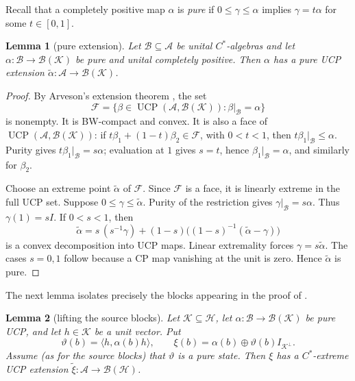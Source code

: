 \documentclass[11pt]{article}
\newtheorem{lemma}{Lemma}
\newcommand{\A}{\mathcal A}
\newcommand{\B}{\mathcal B}
\newcommand{\Hh}{\mathcal H}
\newcommand{\K}{\mathcal K}
\newcommand{\BH}{\mathcal B(\Hh)}
\newcommand{\UCP}{\operatorname{UCP}}
\begin{document}
Recall that a completely positive map $\alpha$ is \emph{pure} if
$0\leq\gamma\leq\alpha$ implies $\gamma=t\alpha$ for some $t\in[0,1]$.

\begin{lemma}[pure extension]\label{lem:pure-extension}
Let $\B\subseteq\A$ be unital $C^*$-algebras and let
$\alpha:\B\to\mathcal B(\K)$ be pure and unital completely positive. Then
$\alpha$ has a pure UCP extension
$\widetilde\alpha:\A\to\mathcal B(\K)$.
\end{lemma}

\begin{proof}
By Arveson's extension theorem \cite{Arveson}, the set
\[
 \mathcal F=\{\beta\in\UCP(\A,\mathcal B(\K)):\beta|_{\B}=\alpha\}
\]
is nonempty. It is BW-compact and convex. It is also a face of
$\UCP(\A,\mathcal B(\K))$: if
$t\beta_1+(1-t)\beta_2\in\mathcal F$, with $0<t<1$, then
$t\beta_1|_{\B}\leq\alpha$. Purity gives
$t\beta_1|_{\B}=s\alpha$; evaluation at $1$ gives $s=t$, hence
$\beta_1|_{\B}=\alpha$, and similarly for $\beta_2$.

Choose an extreme point $\widetilde\alpha$ of $\mathcal F$. Since $\mathcal F$
is a face, it is linearly extreme in the full UCP set. Suppose
$0\leq\gamma\leq\widetilde\alpha$. Purity of the restriction gives
$\gamma|_{\B}=s\alpha$. Thus $\gamma(1)=sI$. If $0<s<1$, then
\[
 \widetilde\alpha
 =s\,(s^{-1}\gamma)+(1-s)\bigl((1-s)^{-1}(\widetilde\alpha-\gamma)\bigr)
\]
is a convex decomposition into UCP maps. Linear extremality forces
$\gamma=s\widetilde\alpha$. The cases $s=0,1$ follow because a CP map vanishing
at the unit is zero. Hence $\widetilde\alpha$ is pure.
\end{proof}

The next lemma isolates precisely the blocks appearing in the proof of
\cite[Lemma 5.1]{BK}.

\begin{lemma}[lifting the source blocks]\label{lem:block}
Let $\K\subseteq\Hh$, let $\alpha:\B\to\mathcal B(\K)$ be pure UCP, and let
$h\in\K$ be a unit vector. Put
\[
 \vartheta(b)=\langle h,\alpha(b)h\rangle,
 \qquad
 \xi(b)=\alpha(b)\oplus\vartheta(b)I_{\K^\perp}.
\]
Assume (as for the source blocks) that $\vartheta$ is a pure state. Then $\xi$
has a $C^*$-extreme UCP extension
$\widetilde\xi:\A\to\BH$.
\end{lemma}
\end{document}
